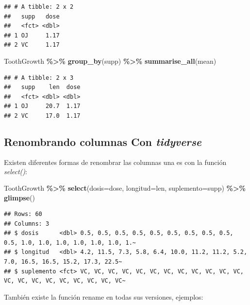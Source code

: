 \documentclass[
]{book}
\newenvironment{Shaded}{\begin{snugshade}}{\end{snugshade}}
\newcommand{\AttributeTok}[1]{\textcolor[rgb]{0.13,0.29,0.53}{#1}}
\newcommand{\FunctionTok}[1]{\textcolor[rgb]{0.13,0.29,0.53}{\textbf{#1}}}
\newcommand{\NormalTok}[1]{#1}
\newcommand{\SpecialCharTok}[1]{\textcolor[rgb]{0.81,0.36,0.00}{\textbf{#1}}}
\begin{document}
\begin{verbatim}
## # A tibble: 2 x 2
##   supp   dose
##   <fct> <dbl>
## 1 OJ     1.17
## 2 VC     1.17
\end{verbatim}

\begin{Shaded}
\begin{Highlighting}[]
\NormalTok{ToothGrowth }\SpecialCharTok{\%\textgreater{}\%}  \FunctionTok{group\_by}\NormalTok{(supp) }\SpecialCharTok{\%\textgreater{}\%}  \FunctionTok{summarise\_all}\NormalTok{(mean)}
\end{Highlighting}
\end{Shaded}

\begin{verbatim}
## # A tibble: 2 x 3
##   supp    len  dose
##   <fct> <dbl> <dbl>
## 1 OJ     20.7  1.17
## 2 VC     17.0  1.17
\end{verbatim}

\hfill\break

\subsection{\texorpdfstring{Renombrando columnas Con \emph{tidyverse}}{Renombrando columnas Con tidyverse}}\label{renombrando-columnas-con-tidyverse}

Existen diferentes formas de renombrar las columnas una es con la función \emph{select()}:

\begin{Shaded}
\begin{Highlighting}[]
\NormalTok{ToothGrowth }\SpecialCharTok{\%\textgreater{}\%} \FunctionTok{select}\NormalTok{(}\AttributeTok{dosis=}\NormalTok{dose, }\AttributeTok{longitud=}\NormalTok{len, }\AttributeTok{suplemento=}\NormalTok{supp) }\SpecialCharTok{\%\textgreater{}\%} \FunctionTok{glimpse}\NormalTok{()}
\end{Highlighting}
\end{Shaded}

\begin{verbatim}
## Rows: 60
## Columns: 3
## $ dosis      <dbl> 0.5, 0.5, 0.5, 0.5, 0.5, 0.5, 0.5, 0.5, 0.5, 0.5, 1.0, 1.0, 1.0, 1.0, 1.0, 1.0, 1.~
## $ longitud   <dbl> 4.2, 11.5, 7.3, 5.8, 6.4, 10.0, 11.2, 11.2, 5.2, 7.0, 16.5, 16.5, 15.2, 17.3, 22.5~
## $ suplemento <fct> VC, VC, VC, VC, VC, VC, VC, VC, VC, VC, VC, VC, VC, VC, VC, VC, VC, VC, VC, VC, VC~
\end{verbatim}

\hfill\break
También existe la función rename en todas sus versiones, ejemplos:
\end{document}
